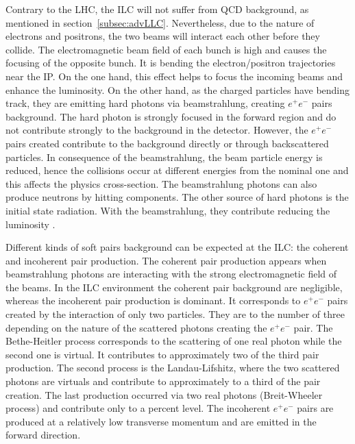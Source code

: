     Contrary to the \gls{LHC}, the \gls{ILC} will not suffer from QCD background, as mentioned in section~\ref{subsec:advLLC}.
    Nevertheless, due to the nature of electrons and positrons, the two beams will interact each other before they collide.
    The electromagnetic beam field of each bunch is high and causes the focusing of the opposite bunch.
    It is bending the electron/positron trajectories near the \gls{IP}.
    On the one hand, this effect helps to focus the incoming beams and enhance the luminosity.
    On the other hand, as the charged particles have bending track, they are emitting hard photons via beamstrahlung, creating $e^+e^-$ pairs background.
    The hard photon is strongly focused in the forward region and do not contribute strongly to the background in the detector.
    However, the $e^+e^-$ pairs created contribute to the background directly or through backscattered particles.
    In consequence of the beamstrahlung, the beam particle energy is reduced, hence the collisions occur at different energies from the nominal one and this affects the physics cross-section.
    The beamstrahlung photons can also produce neutrons by hitting components.
    The other source of hard photons is the initial state radiation. 
    With the beamstrahlung, they contribute reducing the luminosity \cite{Markin2014}.

    Different kinds of soft pairs background can be expected at the \gls{ILC}: the coherent and incoherent pair production.
    The coherent pair production appears when beamstrahlung photons are interacting with the strong electromagnetic field of the beams.
    In the \gls{ILC} environment the coherent pair background are negligible, whereas the incoherent pair production is dominant.
    It corresponds to $e^+e^-$ pairs created by the interaction of only two particles.
    They are to the number of three depending on the nature of the scattered photons creating the $e^+e^-$ pair.
    The Bethe-Heitler process corresponds to the scattering of one real photon while the second one is virtual.
    It contributes to approximately two of the third pair production.
    The second process is the Landau-Lifshitz, where the two scattered photons are virtuals and contribute to approximately to a third of the pair creation.
    The last production occurred via two real photons (Breit-Wheeler process) and contribute only to a percent level.
    The incoherent $e^+e^-$ pairs are produced at a relatively low transverse momentum and are emitted in the forward direction.
    
